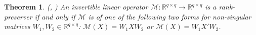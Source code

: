 \documentclass[11pt,letterpaper]{article}
\newtheorem{theorem}{Theorem}
\newcommand{\R}{\mathbb{R}}
\newcommand{\by}{\mathbf{y}}
\renewcommand{\L}{\mathcal{L}}
\begin{document}
%
%



\begin{theorem}(\cite[Theorem 1]{MarMoy:59}, \cite[Theorem 9.6.2]{Tun:00}) \label{thm:external_rankpreserver}  An invertible linear operator $\mathcal{M}: \R^{q \times q} \rightarrow \R^{q \times q}$ is a rank-preserver if and only if $\mathcal{M}$ is of one of the following two forms for non-singular matrices $W_1,W_2 \in \R^{q \times q}$: $\mathcal{M}(X) = W_1 X W_2$ or $\mathcal{M}(X) = W_1 X' W_2$.
\end{theorem}
\end{document}
